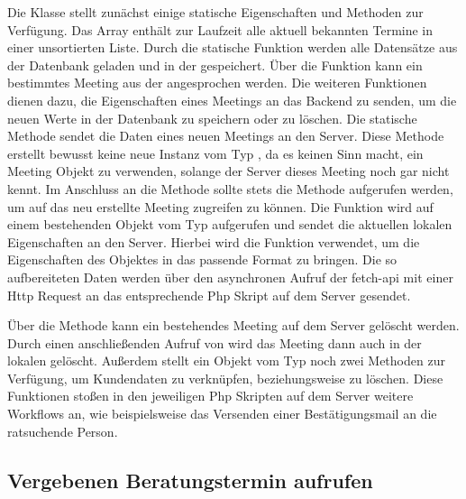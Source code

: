 Die Klasse  stellt zunächst einige statische Eigenschaften und
Methoden zur Verfügung. Das Array  enthält zur Laufzeit alle
aktuell bekannten Termine in einer unsortierten Liste. Durch die statische
Funktion  werden alle Datensätze aus der Datenbank
geladen und in der  gespeichert. Über die Funktion
 kann ein bestimmtes Meeting aus der 
angesprochen werden. Die weiteren Funktionen dienen dazu, die Eigenschaften
eines Meetings an das Backend zu senden, um die neuen Werte in der Datenbank zu
speichern oder zu löschen. Die statische Methode
 sendet die Daten eines neuen Meetings an den
Server. Diese Methode erstellt bewusst keine neue Instanz vom Typ
, da es keinen Sinn macht, ein Meeting Objekt zu verwenden,
solange der Server dieses Meeting noch gar nicht kennt. Im Anschluss an die
 Methode sollte stets die Methode
 aufgerufen werden, um auf das neu erstellte Meeting
zugreifen zu können. Die Funktion  wird auf einem
bestehenden Objekt vom Typ  aufgerufen und sendet die aktuellen
lokalen Eigenschaften an den Server. Hierbei wird die Funktion
 verwendet, um die Eigenschaften des Objektes in das
passende Format zu bringen. Die so aufbereiteten Daten werden über den
asynchronen Aufruf der \gls{fetch-api} mit einer Http Request an das
entsprechende Php Skript auf dem Server gesendet.



Über die Methode  kann ein bestehendes Meeting auf dem Server gelöscht werden. Durch einen anschließenden Aufruf von  wird das Meeting dann auch in der lokalen  gelöscht. Außerdem stellt ein Objekt vom Typ  noch zwei Methoden zur Verfügung, um Kundendaten zu verknüpfen, beziehungsweise zu löschen. Diese Funktionen stoßen in den jeweiligen Php Skripten auf dem Server weitere Workflows an, wie beispielsweise das Versenden einer Bestätigungsmail an die ratsuchende Person.





\subsection*{Vergebenen Beratungstermin aufrufen}

